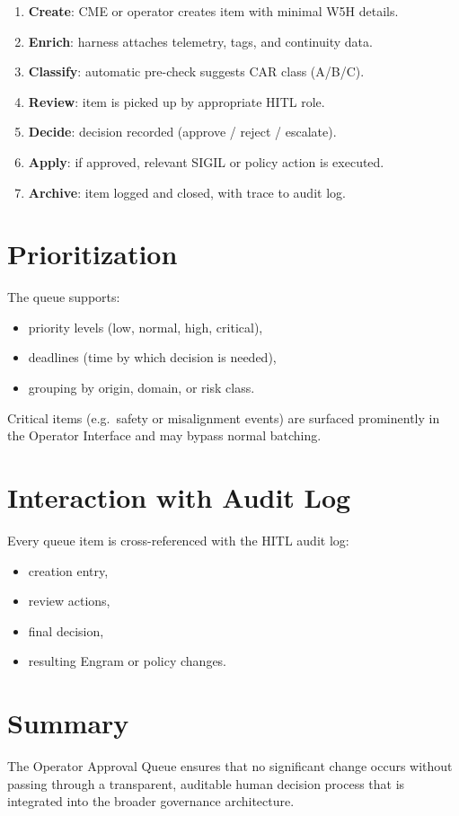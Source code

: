 \begin{enumerate}
    \item \textbf{Create}: CME or operator creates item with minimal W5H details.
    \item \textbf{Enrich}: harness attaches telemetry, tags, and continuity data.
    \item \textbf{Classify}: automatic pre-check suggests CAR class (A/B/C).
    \item \textbf{Review}: item is picked up by appropriate HITL role.
    \item \textbf{Decide}: decision recorded (approve / reject / escalate).
    \item \textbf{Apply}: if approved, relevant SIGIL or policy action is executed.
    \item \textbf{Archive}: item logged and closed, with trace to audit log.
\end{enumerate}

\section{Prioritization}

The queue supports:
\begin{itemize}
    \item priority levels (low, normal, high, critical),
    \item deadlines (time by which decision is needed),
    \item grouping by origin, domain, or risk class.
\end{itemize}

Critical items (e.g.\ safety or misalignment events) are surfaced prominently
in the Operator Interface and may bypass normal batching.

\section{Interaction with Audit Log}

Every queue item is cross-referenced with the HITL audit log:
\begin{itemize}
    \item creation entry,
    \item review actions,
    \item final decision,
    \item resulting Engram or policy changes.
\end{itemize}

\section{Summary}

The Operator Approval Queue ensures that no significant change occurs without
passing through a transparent, auditable human decision process that is
integrated into the broader governance architecture.
